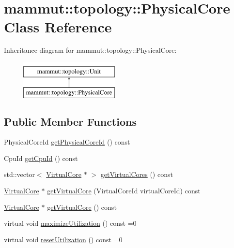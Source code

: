 \hypertarget{classmammut_1_1topology_1_1PhysicalCore}{\section{mammut\-:\-:topology\-:\-:Physical\-Core Class Reference}
\label{classmammut_1_1topology_1_1PhysicalCore}
}
Inheritance diagram for mammut\-:\-:topology\-:\-:Physical\-Core\-:\begin{figure}[H]
\begin{center}
\leavevmode
\includegraphics[height=2.000000cm]{classmammut_1_1topology_1_1PhysicalCore}
\end{center}
\end{figure}
\subsection*{Public Member Functions}
\begin{DoxyCompactItemize}
\item 
Physical\-Core\-Id \hyperlink{classmammut_1_1topology_1_1PhysicalCore_abbd39ff17b300c2ae85e97b6aaef9152}{get\-Physical\-Core\-Id} () const 
\item 
Cpu\-Id \hyperlink{classmammut_1_1topology_1_1PhysicalCore_a70bbe7bbdac1e9d55894b8360c151510}{get\-Cpu\-Id} () const 
\item 
std\-::vector$<$ \hyperlink{classmammut_1_1topology_1_1VirtualCore}{Virtual\-Core} $\ast$ $>$ \hyperlink{classmammut_1_1topology_1_1PhysicalCore_a72446b61fe3749881b902144fdbdfdbc}{get\-Virtual\-Cores} () const 
\item 
\hyperlink{classmammut_1_1topology_1_1VirtualCore}{Virtual\-Core} $\ast$ \hyperlink{classmammut_1_1topology_1_1PhysicalCore_ad367adc41d16538e33e8b749edb8cc43}{get\-Virtual\-Core} (Virtual\-Core\-Id virtual\-Core\-Id) const 
\item 
\hyperlink{classmammut_1_1topology_1_1VirtualCore}{Virtual\-Core} $\ast$ \hyperlink{classmammut_1_1topology_1_1PhysicalCore_a5e237080edce5bcd70e6b24330e38b37}{get\-Virtual\-Core} () const 
\item 
virtual void \hyperlink{classmammut_1_1topology_1_1PhysicalCore_a2fe21bce321b3401e9108bcf29efafae}{maximize\-Utilization} () const =0
\item 
virtual void \hyperlink{classmammut_1_1topology_1_1PhysicalCore_ad6169b49eb4aa01fa570169735875ffe}{reset\-Utilization} () const =0
\end{DoxyCompactItemize}
